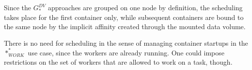     Since the $G_{*}^{DV}$ approaches are grouped on one node by definition, the scheduling takes place for the first container only, while subsequent containers are bound to the same node by the implicit affinity created through the mounted data volume.

    There is no need for scheduling in the sense of managing container startups in the $*_{WORK}^{*}$ use case, since the workers are already running. One could impose restrictions on the set of workers that are allowed to work on a task, though.
